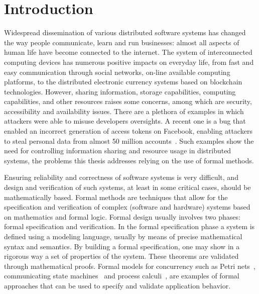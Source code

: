 \pagestyle{headings}
\chapter{Introduction}\label{chapter:Intro}

Widespread dissemination of various distributed software systems has changed the way people communicate, 
learn and run businesses: almost all aspects of human life have become connected to the internet.
The system of interconnected computing devices has numerous positive impacts on everyday life,  
from fast and easy communication through social networks, on-line available computing platforms, 
to the distributed electronic currency systems based on blockchain technologies.
However, sharing information, storage capabilities, computing capabilities, and other resources 
raises some concerns, among which are security, accessibility and availability issues.
There are a plethora of examples in which attackers were able to misuse developers oversights. 
A recent one is a bug that enabled an incorrect 
generation of access tokens on Facebook, enabling attackers to steal personal data from almost 50 million accounts~\cite{fb_attack}.
Such examples show the need for controlling information sharing and resource usage in distributed systems, the problems this thesis addresses relying on the use of formal methods. 



Ensuring reliability and correctness of software systems is very difficult, and design and verification of such systems, at least in some critical cases, should be mathematically based.
Formal methods are techniques that allow for the specification and verification of complex (software and hardware) systems based on mathematics and formal logic. Formal design usually involves two phases: formal specification and verification. In the formal specification phase a system is defined using a modeling language, usually by means of precise mathematical syntax and semantics. By building a formal specification, one may show in a rigorous way a set of properties of the system. These theorems are validated through mathematical proofs. %
Formal models for concurrency such as Petri nets~\cite{petri1962kommunikation, DBLP:books/daglib/0032298}, communicating state machines~\cite{DBLP:journals/jacm/BrandZ83} and process calculi~\cite{ DBLP:books/ph/Hoare85, DBLP:books/sp/Milner80, DBLP:journals/iandc/MilnerPW92a, DBLP:journals/iandc/MilnerPW92b}, are  examples of formal approaches that can be used to specify and validate application behavior.




